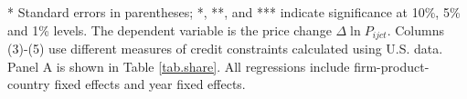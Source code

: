 \documentclass[12pt]{article}
\begin{document}
\begin{table}[htbp]
\begin{threeparttable}
\begin{tabular}{lccccc}
		\bottomrule
	    \end{tabular}
    \begin{tablenotes}
    	\footnotesize
    	\item[*] Standard errors in parentheses; *, **, and *** indicate significance at 10\%, 5\% and 1\% levels. The dependent variable is the price change $\Delta \ln P_{ijct}$. Columns (3)-(5) use different measures of credit constraints calculated using U.S. data. Panel A is shown in Table \ref{tab.share}. All regressions include firm-product-country fixed effects and year fixed effects.
    \end{tablenotes}
	\end{threeparttable}
	\label{tabA.3}
\end{table}
\end{document}
